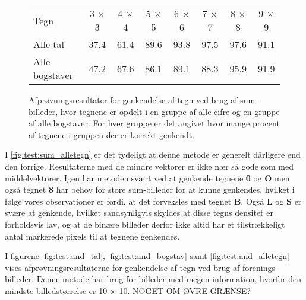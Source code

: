 \begin{figure}[htp]
\centering
\begin{tabular}{|l|c|c|c|c|c|c|c|}\hline
\rowcolor[gray]{0.9} \multicolumn{8}{|>{\columncolor[gray]{0.9}}c|}{\textbf{Sum-billeder}} \\ \hline
Tegn & 3 $\times$ 3 & 4 $\times$ 4 & 5 $\times$ 5 & 6 $\times$ 6 & 7 $\times$ 7 & 8 $\times$ 8 & 9 $\times$ 9 \\\hline
Alle tal & 37.4 & 61.4 & 89.6 & 93.8 & 97.5 & 97.6 & 91.1\\\hline
Alle bogstaver & 47.2 & 67.6 & 86.1 & 89.1 & 88.3 & 95.9 & 91.9\\\hline
\end{tabular}
\caption{Afprøvningsresultater for genkendelse af tegn ved brug af sum-billeder, hvor tegnene er opdelt i en gruppe af alle cifre og en gruppe af alle bogstaver. For hver gruppe er det angivet hvor mange procent af tegnene i gruppen der er korrekt genkendt.}
\label{fig:test:sum_alletegn}
\end{figure}


I \vref{fig:test:sum_alletegn} er det tydeligt at denne metode er generelt dårligere end den forrige. Resultaterne med de mindre vektorer er ikke nær så gode som med middelvektorer. Igen har metoden svært ved at genkende tegnene \textbf{0} og \textbf{O} men også tegnet \textbf{8} har behov for store sum-billeder for at kunne genkendes, hvilket i følge vores observationer er fordi, at det forveksles med tegnet \textbf{B}. Også \textbf{L} og \textbf{S} er svære at genkende, hvilket sandsynligvis skyldes at disse tegns densitet er forholdsvis lav, og at de binære billeder derfor ikke altid har et tilstrækkeligt antal markerede pixels til at tegnene genkendes.

I figurene \vref{fig:test:and_tal}, \vref{fig:test:and_bogstav} samt \vref{fig:test:and_alletegn} vises afprøvningsresultaterne for genkendelse af tegn ved brug af forenings-billeder. Denne metode har brug for billeder med megen information, hvorfor den mindste billedstørrelse er 10 $\times$ 10. NOGET OM ØVRE GRÆNSE?

